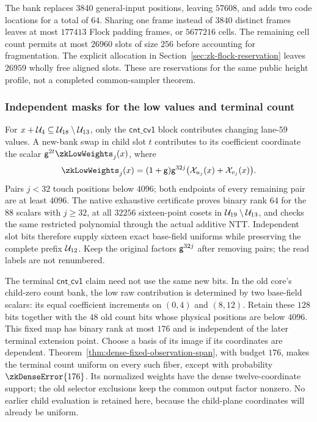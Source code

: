 The bank replaces $3840$ general-input positions, leaving $57608$, and adds two code locations for a total of $64$. Sharing one frame instead of $3840$ distinct frames leaves at most $177413$ Flock padding frames, or $5677216$ cells. The remaining cell count permits at most $26960$ slots of size $256$ before accounting for fragmentation. The explicit allocation in Section~\ref{sec:zk-flock-reservation} leaves $26959$ wholly free aligned slots. These are reservations for the same public height profile, not a completed common-sampler theorem.

\subsubsection{Independent masks for the low values and terminal count}

For $x+\mathcal{U}_4\subseteq\mathcal{U}_{18}\setminus\mathcal{U}_{13}$, only the $\mathsf{cnt\_cv1}$ block contributes changing lane-$59$ values. A new-bank swap in child slot $t$ contributes to its coefficient coordinate the scalar $\gen^{2t}\zkLowWeights_j(x)$, where
\[
 \zkLowWeights_j(x)=(1+\gen)\gen^{32j}
       \bigl(\novel_{u_j}(x)+\novel_{v_j}(x)\bigr).
\]
Pairs $j<32$ touch positions below $4096$; both endpoints of every remaining pair are at least $4096$. The native exhaustive certificate proves binary rank $64$ for the $88$ scalars with $j\ge32$, at all $32256$ sixteen-point cosets in $\mathcal{U}_{19}\setminus\mathcal{U}_{13}$, and checks the same restricted polynomial through the actual additive NTT. Independent slot bits therefore supply sixteen exact base-field uniforms while preserving the complete prefix $\mathcal{U}_{12}$. Keep the original factors $\mathsf{g}^{32j}$ after removing pairs; the read labels are not renumbered.

The terminal $\mathsf{cnt\_cv1}$ claim need not use the same new bits. In the old core's child-zero count bank, the low raw contribution is determined by two base-field scalars: its equal coefficient increments on $(0,4)$ and $(8,12)$. Retain these $128$ bits together with the $48$ old count bits whose physical positions are below $4096$. This fixed map has binary rank at most $176$ and is independent of the later terminal extension point. Choose a basis of its image if its coordinates are dependent. Theorem~\ref{thm:dense-fixed-observation-span}, with budget $176$, makes the terminal count uniform on every such fiber, except with probability $\zkDenseError{176}$. Its normalized weights have the dense twelve-coordinate support; the old selector exclusions keep the common output factor nonzero. No earlier child evaluation is retained here, because the child-plane coordinates will already be uniform.

